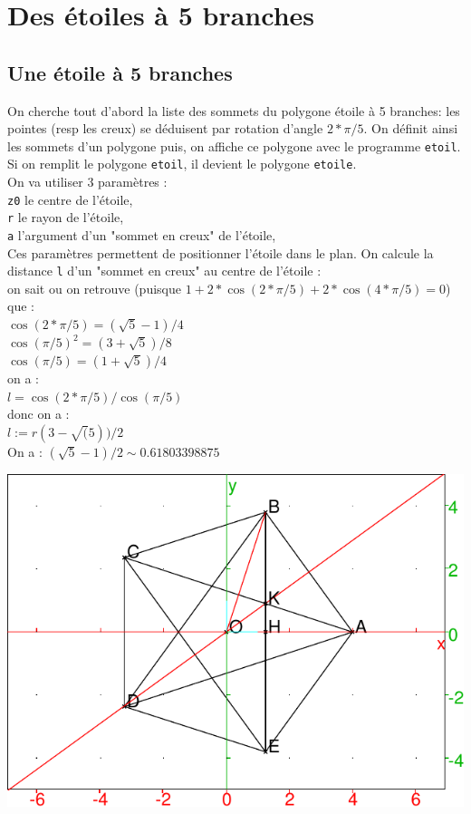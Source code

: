 \documentclass[a4paper,11pt]{book}
\begin{document}
\section{Des \'etoiles \`a 5 branches}
\subsection{Une \'etoile \`a 5 branches}
On cherche tout d'abord la liste des sommets du polygone \'etoile  \`a 5 
branches: les pointes (resp les creux) se d\'eduisent par rotation d'angle 
$2*\pi/5$. On d\'efinit ainsi les sommets d'un polygone puis, on 
affiche  ce polygone avec le programme {\tt etoil}. Si on remplit le polygone 
{\tt etoil}, il devient le polygone {\tt etoile}.\\
On va utiliser 3 param\`etres : \\
{\tt z0} le centre de l'\'etoile,\\
{\tt r} le rayon de l'\'etoile,\\
{\tt a} l'argument d'un "sommet en creux" de l'\'etoile,\\
Ces param\`etres permettent de positionner l'\'etoile dans le plan. 
On calcule la distance {\tt l} d'un "sommet en creux" au  centre de 
l'\'etoile :\\
on sait ou on retrouve (puisque $1+2*\cos(2*\pi/5)+2*\cos(4*\pi/5)=0$) que :\\
$\cos(2*\pi/5)=(\sqrt 5-1)/4$\\
$\cos(\pi/5)^2=(3+\sqrt 5)/8$\\
$\cos(\pi/5)=(1+\sqrt 5)/4$\\
 on a :\\
$l=\cos(2*\pi/5)/\cos(\pi/5)$\\
donc on a :\\
$l:=r(3-\sqrt(5))/2$\\
On a :
$(\sqrt 5-1)/2\sim 0.61803398875$

\noindent
\includegraphics[width=\textwidth]{etoile5}
\end{document}
